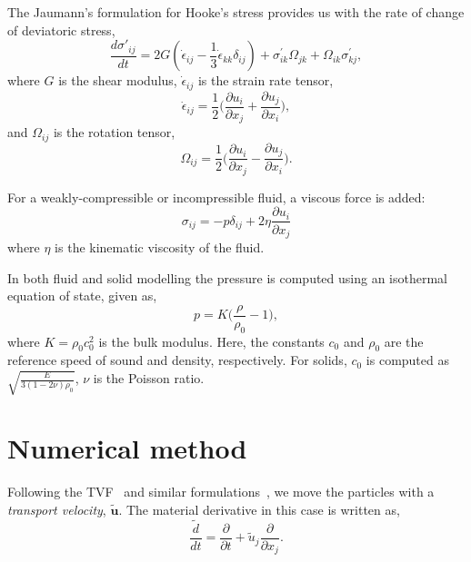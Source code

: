 \documentclass[preprint,12pt]{elsarticle}
\newcommand{\ten}[1]{\ensuremath{\mathbf{#1}}}
\begin{document}
The Jaumann's formulation for Hooke's stress provides us with the rate of
change of deviatoric stress,
\begin{equation}
  \label{eq:jaumann-stress-rate}
  \frac{d \sigma'_{ij}}{dt} = 2G (\dot{\epsilon}_{ij} - \frac{1}{3}
  \dot{\epsilon}_{kk} \delta_{ij}) + \sigma^{'}_{ik}  \Omega_{jk} +
  \Omega_{ik} \sigma^{'}_{kj},
\end{equation}
where $G$ is the shear modulus, $\dot{\epsilon}_{ij}$ is the strain rate tensor,
\begin{equation}
  \label{eq:strain-tensor}
  \dot{\epsilon}_{ij} = \frac{1}{2} \bigg(\frac{\partial u_i}{\partial x_j} +
  \frac{\partial u_j}{\partial x_i} \bigg),
\end{equation}
and $\Omega_{ij}$ is the rotation tensor,
\begin{equation}
  \label{eq:rotational-tensor}
  \Omega_{ij} = \frac{1}{2} \bigg(\frac{\partial u_i}{\partial x_j} -
  \frac{\partial u_j}{\partial x_i} \bigg).
\end{equation}

For a weakly-compressible or incompressible fluid, a viscous force is added:
\begin{equation}
  \label{eq:fluid-stress-decomposition}
  \sigma_{ij} = - p \delta_{ij} + 2 \eta \frac{\partial u_i}{\partial x_j}
\end{equation}
where $\eta$ is the kinematic viscosity of the fluid.

In both fluid and solid modelling the pressure is computed using an
isothermal equation of state, given as,
\begin{equation}
  \label{eq:pressure-equation}
  p = K \bigg(\frac{\rho}{\rho_{0}} - 1 \bigg),
\end{equation}
where $K = \rho_{0} c_0^2$ is the bulk modulus. Here, the constants $c_0$ and
$\rho_0$ are the reference speed of sound and density, respectively. For solids,
$c_0$ is computed as $\sqrt{\frac{E}{3 (1 - 2 \nu)\rho_{0}}}$, $\nu$ is the
Poisson ratio.


\section{Numerical method}


Following the TVF~\cite{Adami2013} and similar
formulations~\cite{oger_ale_sph_2016}, we move the particles with a
\emph{transport velocity}, $\tilde{\ten{u}}$. The material derivative in this
case is written as,
\begin{equation}
  \label{eq:modified-material-derivative}
  \frac{\tilde{d} }{d t} = \frac{\partial }{\partial t} +
  \tilde{u}_j \frac{\partial }{\partial x_j}.
\end{equation}
\end{document}
